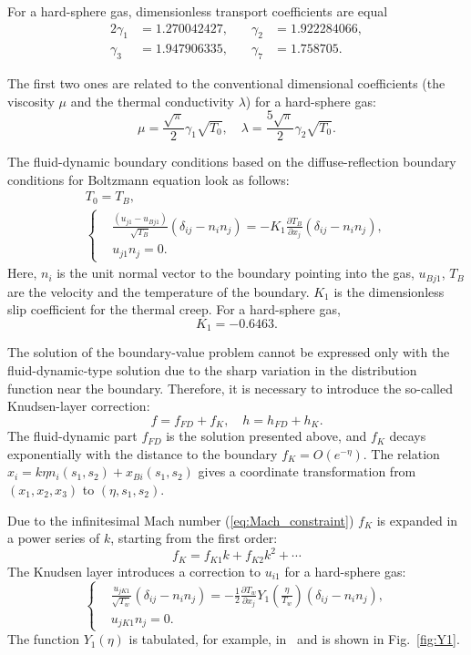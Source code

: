 \documentclass[smallextended, referee]{svjour3} %
\newcommand{\pder}[2][]{\frac{\partial#1}{\partial#2}}
\begin{document}
For a hard-sphere gas, dimensionless transport coefficients are equal
\begin{alignat*}{2}
	\gamma_1 &= 1.270042427, &\quad \gamma_2 &= 1.922284066, \\
	\gamma_3 &= 1.947906335, &\quad \gamma_7 &= 1.758705.
\end{alignat*}

The first two ones are related to the conventional dimensional coefficients
(the viscosity \(\mu\) and the thermal conductivity \(\lambda\)) for a hard-sphere gas:
\[ \mu = \frac{\sqrt\pi}2\gamma_1\sqrt{T_0}, \quad \lambda = \frac{5\sqrt\pi}2\gamma_2\sqrt{T_0}. \]

The fluid-dynamic boundary conditions based on the diffuse-reflection boundary conditions
for Boltzmann equation look as follows:
\begin{gather}
	T_0 = T_B, \label{eq:bound:T} \\
	\left\{
	\begin{aligned}
		& \frac{(u_{j1}-u_{Bj1})}{\sqrt{T_B}}(\delta_{ij}-n_in_j) = 
			-K_1\pder[T_B]{x_j}(\delta_{ij}-n_in_j), \\
		& u_{j1}n_j = 0.
	\end{aligned}
	\right. \label{eq:bound:v}
\end{gather}
Here, \(n_i\) is the unit normal vector to the boundary pointing into the gas,
\(u_{Bj1}\), \(T_B\) are the velocity and the temperature of the boundary.
\(K_1\) is the dimensionless slip coefficient for the thermal creep. For a hard-sphere gas,
\[ K_1 = -0.6463. \]

The solution of the boundary-value problem cannot be expressed only with the fluid-dynamic-type
solution due to the sharp variation in the distribution function near the boundary.
Therefore, it is necessary to introduce the so-called Knudsen-layer correction:
\begin{equation}
	f = f_{FD} + f_K, \quad h = h_{FD} + h_K.
\end{equation}
The fluid-dynamic part \(f_{FD}\) is the solution presented above,
and \(f_K\) decays exponentially with the distance to the boundary \(f_K = O\left(e^{-\eta}\right)\).
The relation \( x_i = k\eta n_i(s_1,s_2) + x_{Bi}(s_1, s_2) \) gives a coordinate transformation
from \((x_1,x_2,x_3)\) to \((\eta,s_1,s_2)\).

Due to the infinitesimal Mach number (\ref{eq:Mach_constraint}) \(f_K\) is expanded
in a power series of \(k\), starting from the first order:
\[ f_K = f_{K1} k + f_{K2} k ^ 2 + \cdots \]
The Knudsen layer introduces a correction to \(u_{i1}\) for a hard-sphere gas:
\begin{equation}
	\left\{
	\begin{aligned}
		& \frac{u_{jK1}}{\sqrt{T_w}}(\delta_{ij}-n_in_j) = 
			-\frac12\pder[T_w]{x_j} Y_1\left(\frac\eta{T_w}\right) (\delta_{ij}-n_in_j), \\
		& u_{jK1}n_j = 0.
	\end{aligned}
	\right. \label{eq:bound:v_K}
\end{equation}
The function \(Y_1(\eta)\) is tabulated, for example, in~\cite{Sone2002, Sone2007} and is shown in Fig.~\ref{fig:Y1}.
\end{document}
